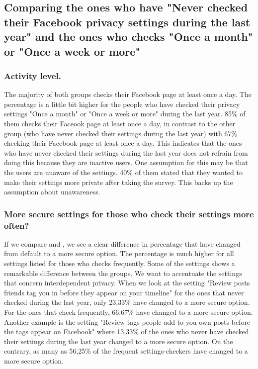 \subsection{Comparing the ones who have "Never checked their Facebook privacy settings during the last year" and the ones who checks "Once a month" or "Once a week or more"} 

\subsubsection{Activity level.}
The majority of both groups checks their Facebook page at least once a day. The percentage is a little bit higher for the people who have checked their privacy settings "Once a month" or "Once a week or more" during the last year. 85\% of them checks their Faceook page at least once a day, in contrast to the other group (who have never checked their settings during the last year) with 67\% checking their Facebook page at least once a day. This indicates that the ones who have never checked their settings during the last year does not refrain from doing this because they are inactive users. One assumption for this may be that the users are unaware of the settings. 40\% of them stated that they wanted to make their settings more private after taking the survey. This backs up the assumption about unawareness.  



\subsubsection{More secure settings for those who check their settings more often?}
If we compare  and , we see a clear difference in percentage that have changed from default to a more secure option. The percentage is much higher for all settings listed for those who checks frequently. Some of the settings shows a remarkable difference between the groups. We want to accentuate the settings that concern interdependent privacy. When we look at the setting "Review posts friends tag you in before they appear on your timeline" for the ones that never checked during the last year, only 23,33\% have changed to a more secure option. For the ones that check frequently, 66,67\% have changed to a more secure option. Another example is the setting "Review tags people add to you own posts before the tags appear on Facebook" where 13,33\% of the ones who never have checked their settings during the last year changed to a more secure option. On the contrary, as many as 56,25\% of the frequent settings-checkers have changed to a more secure option.

